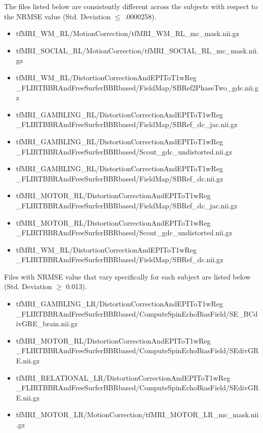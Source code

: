 The files listed below are consistently different across the subjects with respect to the NRMSE value (Std. Deviation $\leq$ .0000258).
\begin{itemize}
  \item {tfMRI\_WM\_RL/MotionCorrection/tfMRI\_WM\_RL\_mc\_mask.nii.gz}
  \item {tfMRI\_SOCIAL\_RL/MotionCorrection/tfMRI\_SOCIAL\_RL\_mc\_mask.nii.gz}
  \item {tfMRI\_WM\_RL/DistortionCorrectionAndEPIToT1wReg
          \_FLIRTBBRAndFreeSurferBBRbased/FieldMap/SBRef2PhaseTwo\_gdc.nii.gz}
  \item {tfMRI\_GAMBLING\_RL/DistortionCorrectionAndEPIToT1wReg
          \_FLIRTBBRAndFreeSurferBBRbased/FieldMap/SBRef\_dc\_jac.nii.gz}
  \item {tfMRI\_GAMBLING\_RL/DistortionCorrectionAndEPIToT1wReg
          \_FLIRTBBRAndFreeSurferBBRbased/Scout\_gdc\_undistorted.nii.gz}
  \item {tfMRI\_GAMBLING\_RL/DistortionCorrectionAndEPIToT1wReg
          \_FLIRTBBRAndFreeSurferBBRbased/FieldMap/SBRef\_dc.nii.gz}
  \item {tfMRI\_MOTOR\_RL/DistortionCorrectionAndEPIToT1wReg
          \_FLIRTBBRAndFreeSurferBBRbased/FieldMap/SBRef\_dc\_jac.nii.gz}
  \item {tfMRI\_MOTOR\_RL/DistortionCorrectionAndEPIToT1wReg
          \_FLIRTBBRAndFreeSurferBBRbased/Scout\_gdc\_undistorted.nii.gz}
  \item {tfMRI\_WM\_RL/DistortionCorrectionAndEPIToT1wReg
          \_FLIRTBBRAndFreeSurferBBRbased/FieldMap/SBRef\_dc.nii.gz}
\end{itemize}

Files with NRMSE value that vary specifically for each subject are listed below (Std. Deviation $\geq$ 0.013).
\begin{itemize}
  \item {tfMRI\_GAMBLING\_LR/DistortionCorrectionAndEPIToT1wReg
         \_FLIRTBBRAndFreeSurferBBRbased/ComputeSpinEchoBiasField/SE\_BCdivGRE\_brain.nii.gz}
  \item {tfMRI\_MOTOR\_RL/DistortionCorrectionAndEPIToT1wReg
         \_FLIRTBBRAndFreeSurferBBRbased/ComputeSpinEchoBiasField/SEdivGRE.nii.gz}
  \item {tfMRI\_RELATIONAL\_LR/DistortionCorrectionAndEPIToT1wReg
         \_FLIRTBBRAndFreeSurferBBRbased/ComputeSpinEchoBiasField/SEdivGRE.nii.gz}
  \item {tfMRI\_MOTOR\_LR/MotionCorrection/tfMRI\_MOTOR\_LR\_mc\_mask.nii.gz}
\end{itemize}

